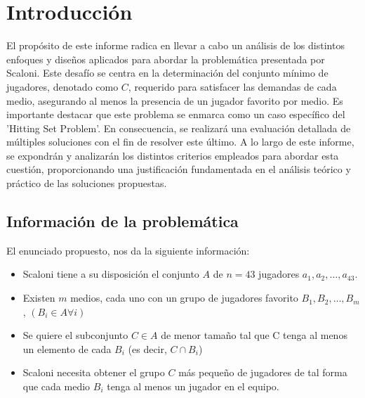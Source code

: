 \section{Introducción}

El propósito de este informe radica en llevar a cabo un análisis de los 
distintos enfoques y diseños aplicados para abordar la problemática presentada por 
Scaloni. Este desafío se centra en la determinación del conjunto mínimo de jugadores,
denotado como $C$, requerido para satisfacer las demandas de cada medio, asegurando al 
menos la presencia de un jugador favorito por medio. Es importante destacar que este 
problema se enmarca como un caso específico del 'Hitting Set Problem'. En consecuencia, 
se realizará una evaluación detallada de múltiples soluciones con el fin de resolver este
último. A lo largo de este informe, se expondrán y analizarán los distintos criterios 
empleados para abordar esta cuestión, proporcionando una justificación fundamentada 
en el análisis teórico y práctico de las soluciones propuestas.

\subsection{Información de la problemática}

El enunciado propuesto, nos da la siguiente información:

\begin{itemize}

    \item Scaloni tiene a su disposición el conjunto $A$ de $n=43$ jugadores $a_1, a_2, \dots, a_{43}$.
    \item Existen $m$ medios, cada uno con un grupo de jugadores favorito $B_1, B_2, \dots, B_m$, 
    $(B_i \in A \forall i)$
    \item Se quiere el subconjunto $C \in A$ de menor tamaño tal que C tenga al menos un elemento de cada $B_i$ (es decir, $C \cap B_i$) 
    \item Scaloni necesita obtener el grupo $C$ más pequeño de jugadores de tal forma que cada medio $B_i$ tenga al menos un jugador en el equipo.

\end{itemize}
